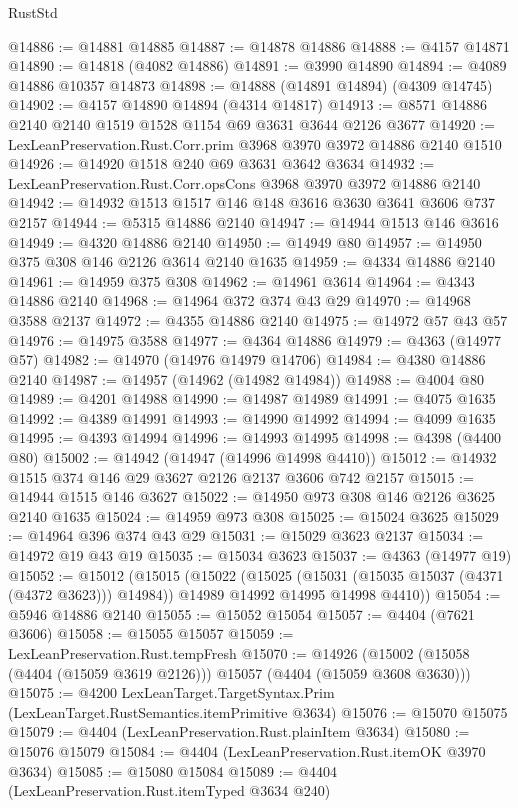\begin{lexlean}{RustStd}
\begin{coremodule}
@14886 := @14881 @14885
@14887 := @14878 @14886
@14888 := @4157 @14871
@14890 := @14818 (@4082 @14886)
@14891 := @3990 @14890
@14894 := @4089 @14886 @10357 @14873
@14898 := @14888 (@14891 @14894) (@4309 @14745)
@14902 := @4157 @14890 @14894 (@4314 @14817)
@14913 := @8571 @14886 @2140 @2140 @1519 @1528 @1154 @69 @3631 @3644 @2126 @3677
@14920 := LexLeanPreservation.Rust.Corr.prim @3968 @3970 @3972 @14886 @2140 @1510
@14926 := @14920 @1518 @240 @69 @3631 @3642 @3634
@14932 := LexLeanPreservation.Rust.Corr.opsCons @3968 @3970 @3972 @14886 @2140
@14942 := @14932 @1513 @1517 @146 @148 @3616 @3630 @3641 @3606 @737 @2157
@14944 := @5315 @14886 @2140
@14947 := @14944 @1513 @146 @3616
@14949 := @4320 @14886 @2140
@14950 := @14949 @80
@14957 := @14950 @375 @308 @146 @2126 @3614 @2140 @1635
@14959 := @4334 @14886 @2140
@14961 := @14959 @375 @308
@14962 := @14961 @3614
@14964 := @4343 @14886 @2140
@14968 := @14964 @372 @374 @43 @29
@14970 := @14968 @3588 @2137
@14972 := @4355 @14886 @2140
@14975 := @14972 @57 @43 @57
@14976 := @14975 @3588
@14977 := @4364 @14886
@14979 := @4363 (@14977 @57)
@14982 := @14970 (@14976 @14979 @14706)
@14984 := @4380 @14886 @2140
@14987 := @14957 (@14962 (@14982 @14984))
@14988 := @4004 @80
@14989 := @4201 @14988
@14990 := @14987 @14989
@14991 := @4075 @1635
@14992 := @4389 @14991
@14993 := @14990 @14992
@14994 := @4099 @1635
@14995 := @4393 @14994
@14996 := @14993 @14995
@14998 := @4398 (@4400 @80)
@15002 := @14942 (@14947 (@14996 @14998 @4410))
@15012 := @14932 @1515 @374 @146 @29 @3627 @2126 @2137 @3606 @742 @2157
@15015 := @14944 @1515 @146 @3627
@15022 := @14950 @973 @308 @146 @2126 @3625 @2140 @1635
@15024 := @14959 @973 @308
@15025 := @15024 @3625
@15029 := @14964 @396 @374 @43 @29
@15031 := @15029 @3623 @2137
@15034 := @14972 @19 @43 @19
@15035 := @15034 @3623
@15037 := @4363 (@14977 @19)
@15052 := @15012
    (@15015
      (@15022
        (@15025 (@15031 (@15035 @15037 (@4371 (@4372 @3623))) @14984))
        @14989
        @14992
        @14995
        @14998
        @4410))
@15054 := @5946 @14886 @2140
@15055 := @15052 @15054
@15057 := @4404 (@7621 @3606)
@15058 := @15055 @15057
@15059 := LexLeanPreservation.Rust.tempFresh
@15070 := @14926 (@15002 (@15058 (@4404 (@15059 @3619 @2126))) @15057 (@4404 (@15059 @3608 @3630)))
@15075 := @4200 LexLeanTarget.TargetSyntax.Prim (LexLeanTarget.RustSemantics.itemPrimitive @3634)
@15076 := @15070 @15075
@15079 := @4404 (LexLeanPreservation.Rust.plainItem @3634)
@15080 := @15076 @15079
@15084 := @4404 (LexLeanPreservation.Rust.itemOK @3970 @3634)
@15085 := @15080 @15084
@15089 := @4404 (LexLeanPreservation.Rust.itemTyped @3634 @240)

\end{coremodule}
\end{lexlean}
